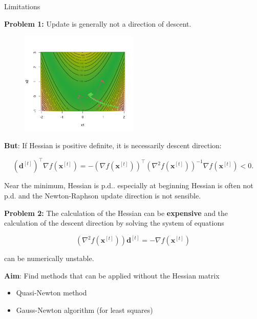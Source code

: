 \documentclass[11pt,compress,t,notes=noshow, xcolor=table]{beamer}
\begin{document}
\begin{vbframe}{Limitations}

\textbf{Problem 1:} Update is generally not a direction of descent.

\vspace*{-0.3cm}
\begin{figure}
    \centering
    \includegraphics[width=0.5\textwidth]{slides/05-multivariate-second-order/figure_man/NR_2.png}
\end{figure}

\begin{footnotesize}
\textbf{But}: If Hessian is positive definite, it is necessarily descent direction:

$$
(\mathbf{d}^{[t]})^\top \nabla f(\mathbf{x}^{[t]}) = - \left(\nabla f(\mathbf{x}^{[t]})\right)^\top \left(\nabla^2 f(\mathbf{x}^{[t]})\right)^{-1} \nabla f(\mathbf{x}^{[t]}) <0.
$$

Near the minimum, Hessian is p.d.. especially at beginning Hessian is often not p.d. and the Newton-Raphson update direction is not sensible.
\end{footnotesize}

\framebreak

\textbf{Problem 2:} The calculation of the Hessian can be \textbf{expensive} and the calculation of the descent direction by solving the system of equations

$$
\left(\nabla^2 f(\mathbf{x}^{[t]})\right)\mathbf{d}^{[t]} = - \nabla f(\mathbf{x}^{[t]})
$$

can be numerically unstable.

\lz

\textbf{Aim}: Find methods that can be applied without the Hessian matrix
\begin{itemize}
\item Quasi-Newton method
\item Gauss-Newton algorithm (for least squares)
\end{itemize}



\end{vbframe}
\end{document}
